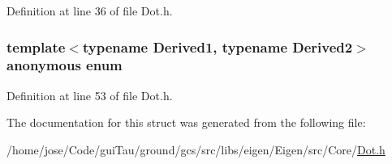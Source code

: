 Definition at line 36 of file Dot.\-h.

\hypertarget{structei__dot__traits_a63dabac10a1037e44f9cee1cde8c46d2}{\subsubsection[{anonymous enum}]{\setlength{\rightskip}{0pt plus 5cm}template$<$typename Derived1, typename Derived2$>$ anonymous enum}}\label{structei__dot__traits_a63dabac10a1037e44f9cee1cde8c46d2}


Definition at line 53 of file Dot.\-h.



The documentation for this struct was generated from the following file\-:\begin{DoxyCompactItemize}
\item 
/home/jose/\-Code/gui\-Tau/ground/gcs/src/libs/eigen/\-Eigen/src/\-Core/\hyperlink{_dot_8h}{Dot.\-h}\end{DoxyCompactItemize}
